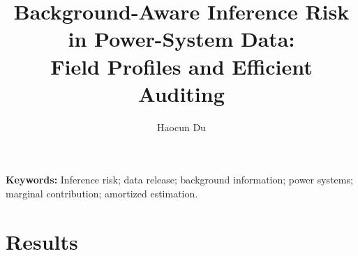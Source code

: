 \documentclass[11pt,a4paper]{article}
\title{Background-Aware Inference Risk in Power-System Data:\\Field Profiles and Efficient Auditing}
\author{Haocun Du}
\date{}
\begin{document}
\maketitle

\noindent\textbf{Keywords:} Inference risk; data release; background information; power systems; marginal contribution; amortized estimation.





\section{Results}\label{sec:results}






\FloatBarrier

\appendix

\FloatBarrier


\end{document}
